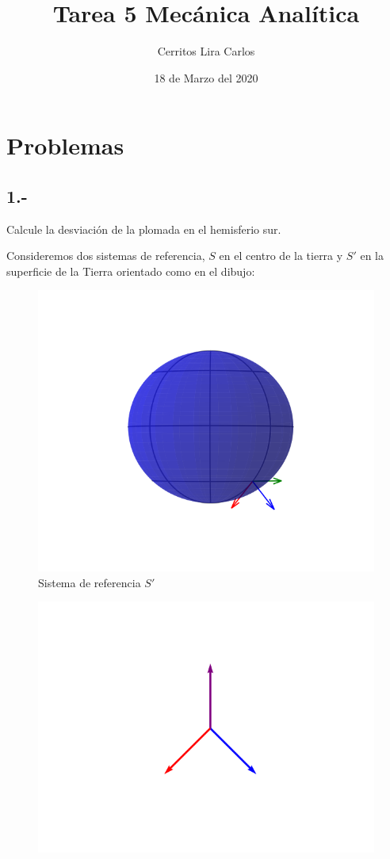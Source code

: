 \documentclass{article}
\title{Tarea 5 Mecánica Analítica}
\author{Cerritos Lira Carlos}
\date{18 de Marzo del 2020}
\begin{document}
\maketitle
\section*{Problemas}
\subsection*{1.- }
Calcule la desviación de la plomada en el hemisferio sur.
\begin{tcolorbox}
    Consideremos dos sistemas de referencia, $S$ en el centro de la tierra y $S'$ en la superficie de la Tierra orientado como en el dibujo:
    \begin{figure}[H]
        \centering
        \includegraphics[scale=0.5, trim=50 50 50 50, clip]{p1_world}
        \caption{Sistema de referencia $S'$}
        \label{fig:galaxy}
    \end{figure}
    \begin{figure}[H]
        \centering
        \includegraphics[scale=0.5, trim=60 60 60 60, clip]{p1_axis}

\end{figure}
\end{tcolorbox}
\end{document}

